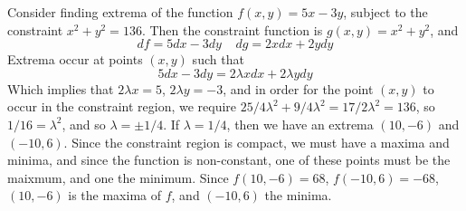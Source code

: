 \begin{example}
    Consider finding extrema of the function $f(x,y) = 5x - 3y$, subject to the constraint $x^2 + y^2 = 136$. Then the constraint function is $g(x,y) = x^2 + y^2$, and
    \[ df = 5dx - 3dy\ \ \ \ \ dg = 2x dx + 2y dy \]
    Extrema occur at points $(x,y)$ such that
    \[ 5dx - 3dy = 2 \lambda x dx + 2 \lambda y dy \]
    Which implies that $2 \lambda x = 5$, $2 \lambda y = -3$, and in order for the point $(x,y)$ to occur in the constraint region, we require $25/4 \lambda^2 + 9/4 \lambda^2 = 17/2\lambda^2 = 136$, so $1/16 = \lambda^2$, and so $\lambda = \pm 1/4$. If $\lambda = 1/4$, then we have an extrema $(10, -6)$ and $(-10, 6)$. Since the constraint region is compact, we must have a maxima and minima, and since the function is non-constant, one of these points must be the maixmum, and one the minimum. Since $f(10,-6) = 68$, $f(-10,6) = -68$, $(10,-6)$ is the maxima of $f$, and $(-10,6)$ the minima.
\end{example}

